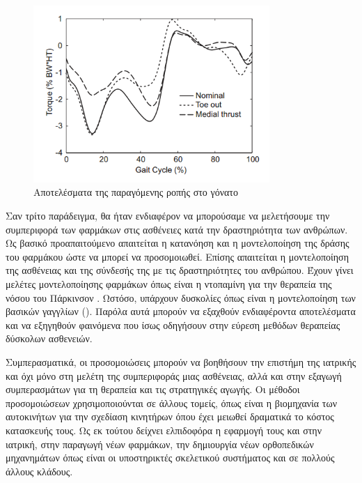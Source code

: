 \begin{figure}[H]
    \centering
    \includegraphics[width=0.8\textwidth, keepaspectratio]{fig/knee-load.png}
    \caption{Αποτελέσματα της παραγόμενης ροπής στο γόνατο \cite{fregly07}}
    \label{fig:knee-load}
\end{figure}

Σαν τρίτο παράδειγμα, θα ήταν ενδιαφέρον να μπορούσαμε να μελετήσουμε την συμπεριφορά των φαρμάκων στις ασθένειες κατά την δραστηριότητα των ανθρώπων. Ως βασικό προαπαιτούμενο απαιτείται η κατανόηση και η μοντελοποίηση της δράσης του φαρμάκου ώστε να μπορεί να προσομοιωθεί. Επίσης απαιτείται η μοντελοποίηση της ασθένειας και της σύνδεσής της με τις δραστηριότητες του ανθρώπου. Έχουν γίνει μελέτες μοντελοποίησης φαρμάκων όπως είναι η ντοπαμίνη για την θεραπεία της νόσου του Πάρκινσον \cite{haeri05}. Ωστόσο, υπάρχουν δυσκολίες όπως είναι η μοντελοποίηση των βασικών γαγγλίων (). Παρόλα αυτά μπορούν να εξαχθούν ενδιαφέροντα αποτελέσματα και να εξηγηθούν φαινόμενα που ίσως οδηγήσουν στην εύρεση μεθόδων θεραπείας δύσκολων ασθενειών.

Συμπερασματικά, οι προσομοιώσεις μπορούν να βοηθήσουν την επιστήμη της ιατρικής και όχι μόνο στη μελέτη της συμπεριφοράς μιας ασθένειας, αλλά και στην εξαγωγή συμπερασμάτων για τη θεραπεία και τις στρατηγικές αγωγής. Οι μέθοδοι προσομοιώσεων χρησιμοποιούνται σε άλλους τομείς, όπως είναι η βιομηχανία των αυτοκινήτων για την σχεδίαση κινητήρων όπου έχει μειωθεί δραματικά το κόστος κατασκευής τους. Ως εκ τούτου δείχνει ελπιδοφόρα η εφαρμογή τους και στην ιατρική, στην παραγωγή νέων φαρμάκων, την δημιουργία νέων ορθοπεδικών μηχανημάτων όπως είναι οι υποστηρικτές σκελετικού συστήματος \cite{stopforth12} και σε πολλούς άλλους κλάδους.

